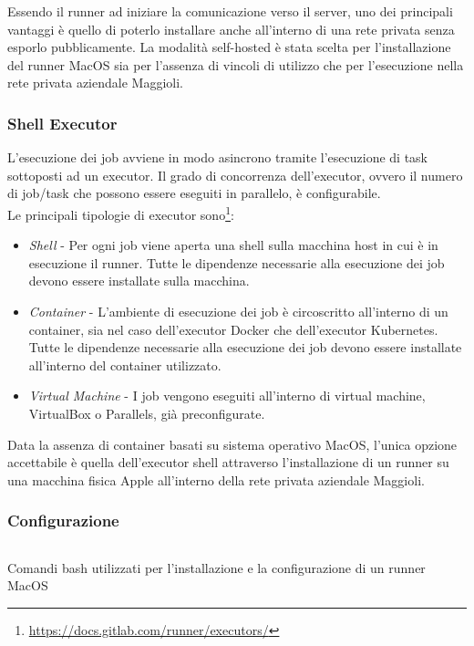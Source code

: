 Essendo il runner ad iniziare la comunicazione verso il server, uno dei principali vantaggi è quello di poterlo installare anche all'interno di una rete privata senza esporlo pubblicamente. La modalità self-hosted è stata scelta per l'installazione del runner MacOS sia per l'assenza di vincoli di utilizzo che per l'esecuzione nella rete privata aziendale Maggioli.

\subsubsection{Shell Executor}
L'esecuzione dei job avviene in modo asincrono tramite l'esecuzione di task sottoposti ad un executor. Il grado di concorrenza dell'executor, ovvero il numero di job/task che possono essere eseguiti in parallelo, è configurabile.\\
Le principali tipologie di executor sono\footnote{\url{https://docs.gitlab.com/runner/executors/}}:
\begin{itemize}
    \item \textit{Shell} - Per ogni job viene aperta una shell sulla macchina host in cui è in esecuzione il runner. Tutte le dipendenze necessarie alla esecuzione dei job devono essere installate sulla macchina.
    \item \textit{Container} - L'ambiente di esecuzione dei job è circoscritto all'interno di un container, sia nel caso dell'executor Docker che dell'executor Kubernetes. Tutte le dipendenze necessarie alla esecuzione dei job devono essere installate all'interno del container utilizzato.
    \item \textit{Virtual Machine} - I job vengono eseguiti all'interno di virtual machine, VirtualBox o Parallels, già preconfigurate.
\end{itemize}

Data la assenza di container basati su sistema operativo MacOS, l'unica opzione accettabile è quella dell'executor shell attraverso l'installazione di un runner su una macchina fisica Apple all'interno della rete privata aziendale Maggioli.

\subsubsection{Configurazione}

\begin{listing}[H]
\inputminted{bash}{code/4-macos-runner-setup}
\caption{Comandi bash utilizzati per l'installazione e la configurazione di un runner MacOS}
\end{listing}

